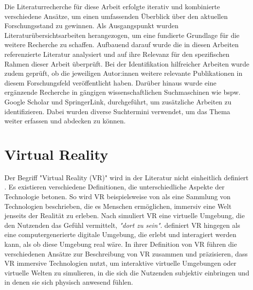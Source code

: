 Die Literaturrecherche für diese Arbeit erfolgte iterativ und kombinierte verschiedene Ansätze, um einen umfassenden Überblick über den aktuellen Forschungsstand zu gewinnen. Als Ausgangspunkt wurden Literaturübersichtsarbeiten herangezogen, um eine fundierte Grundlage für die weitere Recherche zu schaffen. Aufbauend darauf wurde die in diesen Arbeiten referenzierte Literatur analysiert und auf ihre Relevanz für den spezifischen Rahmen dieser Arbeit überprüft. Bei der Identifikation hilfreicher Arbeiten wurde zudem geprüft, ob die jeweiligen Autor:innen weitere relevante Publikationen in diesem Forschungsfeld veröffentlicht haben. Darüber hinaus wurde eine ergänzende Recherche in gängigen wissenschaftlichen Suchmaschinen wie bspw. Google Scholar und SpringerLink, durchgeführt, um zusätzliche Arbeiten zu identifizieren. Dabei wurden diverse Suchtermini verwendet, um das Thema weiter erfassen und abdecken zu können. 

\section{Virtual Reality}

Der Begriff "Virtual Reality (VR)" wird in der Literatur nicht einheitlich definiert \citep{wohlgenannt_virtual_2020}. Es existieren verschiedene Definitionen, die unterschiedliche Aspekte der Technologie betonen. So wird VR beispielsweise von \citet{berg_industry_2017} als eine Sammlung von Technologien beschrieben, die es Menschen ermöglichen, immersiv eine Welt jenseits der Realität zu erleben. 
Nach \citet{4287241} simuliert VR eine virtuelle Umgebung, die den Nutzenden das Gefühl vermittelt, \textit{"dort zu sein"}. \citet{jerald_vr_2016} definiert VR hingegen als eine computergenerierte digitale Umgebung, die erlebt und interagiert werden kann, als ob diese Umgebung real wäre. In ihrer Definition von VR führen \citet{wohlgenannt_virtual_2020} die verschiedenen Ansätze zur Beschreibung von VR zusammen und präzisieren, dass VR immersive Technologien nutzt, um interaktive virtuelle Umgebungen oder virtuelle Welten zu simulieren, in die sich die Nutzenden subjektiv einbringen und in denen sie sich physisch anwesend fühlen.

